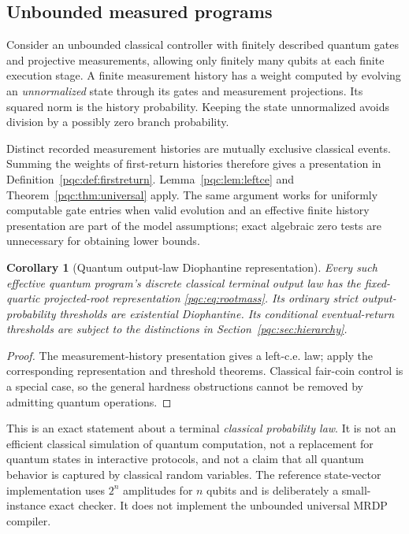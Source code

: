 \documentclass[11pt,letterpaper]{article}
\numberwithin{equation}{section}
\newtheorem{corollary}[theorem]{Corollary}
\theoremstyle{definition}
\theoremstyle{remark}
\begin{document}
\subsection{Unbounded measured programs}
Consider an unbounded classical controller with finitely described quantum
gates and projective measurements, allowing only finitely many qubits at
each finite execution stage. A finite measurement history has a weight
computed by evolving an \emph{unnormalized} state through its gates and
measurement projections. Its squared norm is the history probability.
Keeping the state unnormalized avoids division by a possibly zero branch
probability.

Distinct recorded measurement histories are mutually exclusive classical
events. Summing the weights of first-return histories therefore gives a
presentation in Definition~\ref{pqc:def:firstreturn}. Lemma~\ref{pqc:lem:leftce} and
Theorem~\ref{pqc:thm:universal} apply. The same argument works for uniformly
computable gate entries when valid evolution and an effective finite
history presentation are part of the model assumptions; exact algebraic
zero tests are unnecessary for obtaining lower bounds.

\begin{corollary}[Quantum output-law Diophantine representation]
Every such effective quantum program's discrete classical terminal output
law has the fixed-quartic projected-root representation
\eqref{pqc:eq:rootmass}. Its ordinary strict output-probability thresholds are
existential Diophantine. Its conditional eventual-return thresholds are
subject to the distinctions in Section~\ref{pqc:sec:hierarchy}.
\end{corollary}
\begin{proof}
The measurement-history presentation gives a left-c.e. law; apply the
corresponding representation and threshold theorems. Classical fair-coin
control is a special case, so the general hardness obstructions cannot be
removed by admitting quantum operations.
\end{proof}

This is an exact statement about a terminal \emph{classical probability
law}. It is not an efficient classical simulation of quantum computation,
not a replacement for quantum states in interactive protocols, and not a
claim that all quantum behavior is captured by classical random variables.
The reference state-vector implementation uses $2^n$ amplitudes for $n$
qubits and is deliberately a small-instance exact checker. It does not
implement the unbounded universal MRDP compiler.
\end{document}
